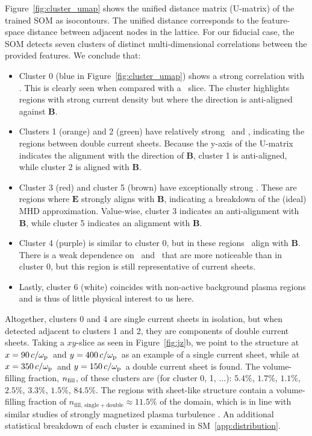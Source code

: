 Figure~\ref{fig:cluster_umap} shows the unified distance matrix (U-matrix) of the trained SOM as isocontours.
The unified distance corresponds to the feature-space distance between adjacent nodes in the lattice.
For our fiducial case, the SOM detects seven clusters of distinct multi-dimensional correlations between the provided features.
We conclude that:
\begin{itemize}
\item Cluster 0 (blue in Figure~\ref{fig:cluster_umap}) shows a strong correlation with \jpar.
This is clearly seen when compared with a \jz~slice.
The cluster highlights regions with strong current density but where the direction is anti-aligned against $\mathbf{B}$.
\item Clusters 1 (orange) and 2 (green) have relatively strong \bperp~and \jasym, indicating the regions between double current sheets.
Because the y-axis of the U-matrix indicates the alignment with the direction of $\mathbf{B}$, cluster 1 is anti-aligned, while cluster 2 is aligned with $\mathbf{B}$.
\item Cluster 3 (red) and cluster 5 (brown) have exceptionally strong \epar.
These are regions where $\mathbf{E}$ strongly aligns with $\mathbf{B}$, indicating a breakdown of the (ideal) MHD approximation. Value-wise, cluster 3 indicates an anti-alignment with $\mathbf{B}$, while cluster 5 indicates an alignment with $\mathbf{B}$.
\item Cluster 4 (purple) is similar to cluster 0, but in these regions \jpar~align with $\textbf{B}$. There is a weak dependence on \bperp~and \jasym~that are more noticeable than in cluster 0, but this region is still representative of current sheets.
\item Lastly, cluster 6 (white) coincides with non-active background plasma regions and is thus of little physical interest to us here.
\end{itemize}

Altogether, clusters 0 and 4 are single current sheets in isolation, but when detected adjacent to clusters 1 and 2, they are components of double current sheets.
Taking a $xy$-slice as seen in Figure~\ref{fig:jz}b, we point to the structure at $x = 90\, c/\omega_{\rm p}$\ and $y = 400\, c/\omega_{\rm p}$\ as an example of a single current sheet, while at $x = 350\, c/\omega_{\rm p}$\ and $y = 150\, c/\omega_{\rm p}$\ a double current sheet is found.
The volume-filling fraction, $n_{\rm fill}$, of these clusters are (for cluster 0, 1, $\ldots$): $5.4\%$, $1.7\%$, $1.1\%$, $2.5\%$, $3.3\%$, $1.5\%$, $84.5\%$.
The regions with sheet-like structure contain a volume-filling fraction of $n_{\mathrm{fill,\, single+double}} \approx 11.5\%$ of the domain, which is in line with similar studies of strongly magnetized plasma turbulence \citep[e.g.,][]{tenbarge_current_2013,vega_electron-scale_2023}.
An additional statistical breakdown of each cluster is examined in SM~\ref{app:distribution}.

